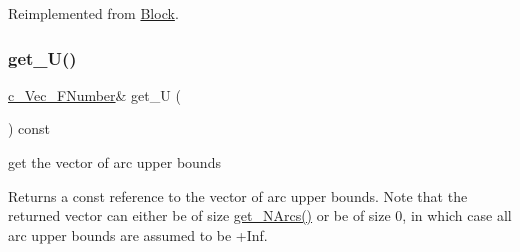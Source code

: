 Reimplemented from \mbox{\hyperlink{class_s_m_spp__di__unipi__it_1_1_block_a1db67c2f65111af4314e79dfc81ba597}{Block}}.

\mbox{\label{class_s_m_spp__di__unipi__it_1_1_m_c_f_block_a8bf8106813b11c77e6dd20868ad13cf6}} 
\subsubsection{\texorpdfstring{get\+\_\+\+U()}{get\_U()}}
{\footnotesize\ttfamily \mbox{\hyperlink{class_s_m_spp__di__unipi__it_1_1_m_c_f_block_ae74990406673bbcdf64e1a3e3b680d5c}{c\+\_\+\+Vec\+\_\+\+F\+Number}}\& get\+\_\+U (\begin{DoxyParamCaption}\item[{void}]{ }\end{DoxyParamCaption}) const\hspace{0.3cm}{\ttfamily [inline]}}



get the vector of arc upper bounds 

Returns a const reference to the vector of arc upper bounds. Note that the returned vector can either be of size \mbox{\hyperlink{class_s_m_spp__di__unipi__it_1_1_m_c_f_block_a42c106aa81abe650c7baa0da547ade7e}{get\+\_\+\+N\+Arcs()}} or be of size 0, in which case all arc upper bounds are assumed to be +\+Inf. \mbox{\label{class_s_m_spp__di__unipi__it_1_1_m_c_f_block_a4f7acee4b29dfaec7b83c2ad3aea5f46}} 
